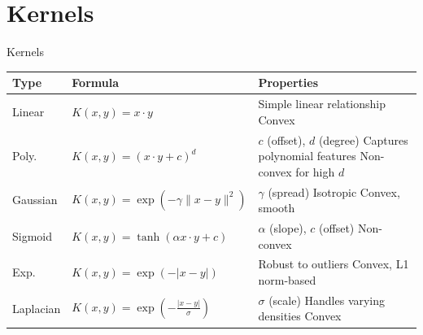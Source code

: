 \documentclass[10pt,svgnames,fragile]{beamer}
\begin{document}
\section{Kernels}
\begin{frame}{Kernels}
    \begin{table}[h]
    \centering
    \small
    \begin{tabular}{|>{\centering\arraybackslash}m{2cm}|>{\centering\arraybackslash}m{4cm}|>{\arraybackslash}m{4cm}|}
    \hline
    \textbf{Type} & \textbf{Formula} & \textbf{Properties} \\
    \hline
    Linear & $K(x, y) = x \cdot y$ & Simple linear relationship \newline Convex \\
    \hline
    Poly. & $K(x, y) = (x \cdot y + c)^d$ & \(c\) (offset), \(d\) (degree) \newline Captures polynomial features \newline Non-convex for high \(d\) \\
    \hline
    Gaussian & $K(x, y) = \exp(-\gamma \|x - y\|^2)$ & \(\gamma\) (spread) \newline Isotropic \newline Convex, smooth \\
    \hline
    Sigmoid & $K(x, y) = \tanh(\alpha x \cdot y + c)$ & \(\alpha\) (slope), \(c\) (offset) \newline Non-convex \\
    \hline
    Exp. & $K(x, y) = \exp(-|x - y|)$ & Robust to outliers \newline Convex, L1 norm-based \\
    \hline
    Laplacian & $K(x, y) = \exp\left(-\frac{|x - y|}{\sigma}\right)$ & \(\sigma\) (scale) \newline Handles varying densities \newline Convex \\
    \hline
    \end{tabular}
    \label{tab:kernels}
    \end{table}
\end{frame}
\end{document}

